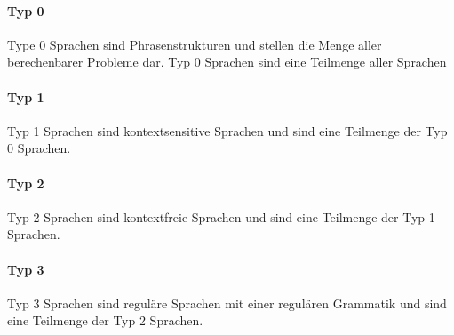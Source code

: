 \documentclass[../main.tex]{subfiles}
\begin{document}
            \paragraph{Typ 0}
                Type 0 Sprachen sind Phrasenstrukturen und stellen die Menge aller berechenbarer Probleme dar. Typ 0 Sprachen sind eine Teilmenge aller Sprachen
                
            \paragraph{Typ 1}
                Typ 1 Sprachen sind kontextsensitive Sprachen und sind eine Teilmenge der Typ 0 Sprachen.
                
            \paragraph{Typ 2}
                Typ 2 Sprachen sind kontextfreie Sprachen und sind eine Teilmenge der Typ 1 Sprachen.
                
            \paragraph{Typ 3}
                Typ 3 Sprachen sind reguläre Sprachen mit einer regulären Grammatik und sind eine Teilmenge der Typ 2 Sprachen.
\end{document}
